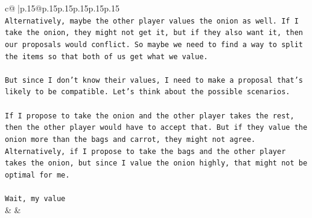 \documentclass{article}
\begin{document}
{\begin{supertabular}{c@{$\;$}|p{.15\linewidth}@{}p{.15\linewidth}p{.15\linewidth}p{.15\linewidth}p{.15\linewidth}p{.15\linewidth}}
{{{\\ 
\texttt{Alternatively, maybe the other player values the onion as well. If I take the onion, they might not get it, but if they also want it, then our proposals would conflict. So maybe we need to find a way to split the items so that both of us get what we value.} \\
\\ 
\texttt{But since I don't know their values, I need to make a proposal that's likely to be compatible. Let's think about the possible scenarios.} \\
\\ 
\texttt{If I propose to take the onion and the other player takes the rest, then the other player would have to accept that. But if they value the onion more than the bags and carrot, they might not agree. Alternatively, if I propose to take the bags and the other player takes the onion, but since I value the onion highly, that might not be optimal for me.} \\
\\ 
\texttt{Wait, my value} \\
            }
        }
    }
    & & \\ \\


\end{supertabular}}
\end{document}
